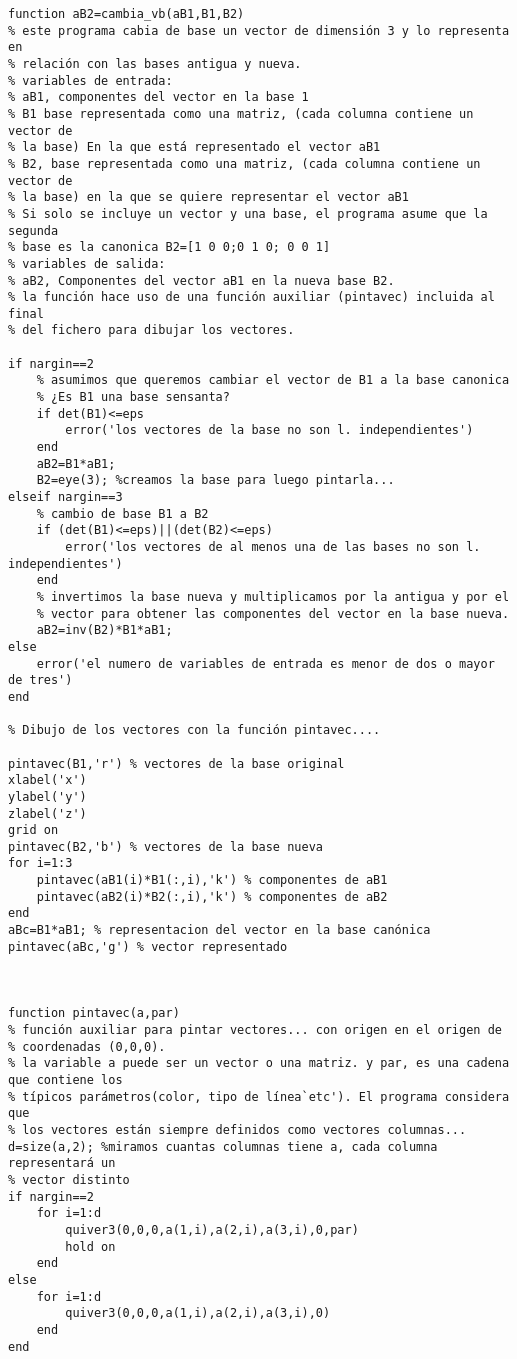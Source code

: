 \begin{lstlisting}
function aB2=cambia_vb(aB1,B1,B2)
% este programa cabia de base un vector de dimensión 3 y lo representa en
% relación con las bases antigua y nueva.
% variables de entrada:
% aB1, componentes del vector en la base 1
% B1 base representada como una matriz, (cada columna contiene un vector de
% la base) En la que está representado el vector aB1
% B2, base representada como una matriz, (cada columna contiene un vector de
% la base) en la que se quiere representar el vector aB1
% Si solo se incluye un vector y una base, el programa asume que la segunda
% base es la canonica B2=[1 0 0;0 1 0; 0 0 1]
% variables de salida:
% aB2, Componentes del vector aB1 en la nueva base B2.
% la función hace uso de una función auxiliar (pintavec) incluida al final
% del fichero para dibujar los vectores.

if nargin==2
    % asumimos que queremos cambiar el vector de B1 a la base canonica
    % ¿Es B1 una base sensanta?
    if det(B1)<=eps
        error('los vectores de la base no son l. independientes')
    end
    aB2=B1*aB1;
    B2=eye(3); %creamos la base para luego pintarla...
elseif nargin==3
    % cambio de base B1 a B2
    if (det(B1)<=eps)||(det(B2)<=eps)
        error('los vectores de al menos una de las bases no son l. independientes')
    end
    % invertimos la base nueva y multiplicamos por la antigua y por el
    % vector para obtener las componentes del vector en la base nueva.
    aB2=inv(B2)*B1*aB1;
else
    error('el numero de variables de entrada es menor de dos o mayor de tres')
end

% Dibujo de los vectores con la función pintavec....

pintavec(B1,'r') % vectores de la base original
xlabel('x')
ylabel('y')
zlabel('z')
grid on
pintavec(B2,'b') % vectores de la base nueva
for i=1:3
    pintavec(aB1(i)*B1(:,i),'k') % componentes de aB1
    pintavec(aB2(i)*B2(:,i),'k') % componentes de aB2
end
aBc=B1*aB1; % representacion del vector en la base canónica
pintavec(aBc,'g') % vector representado



function pintavec(a,par)
% función auxiliar para pintar vectores... con origen en el origen de
% coordenadas (0,0,0).
% la variable a puede ser un vector o una matriz. y par, es una cadena que contiene los
% típicos parámetros(color, tipo de línea`etc'). El programa considera que
% los vectores están siempre definidos como vectores columnas...
d=size(a,2); %miramos cuantas columnas tiene a, cada columna representará un
% vector distinto
if nargin==2
    for i=1:d
        quiver3(0,0,0,a(1,i),a(2,i),a(3,i),0,par)
        hold on
    end
else
    for i=1:d
        quiver3(0,0,0,a(1,i),a(2,i),a(3,i),0)
    end
end

\end{lstlisting}

